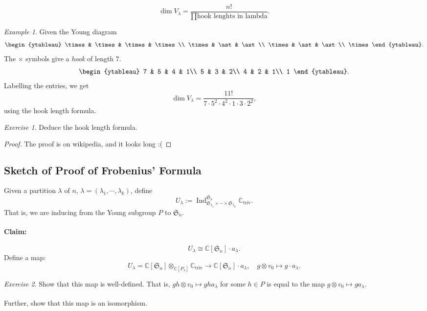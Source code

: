 \documentclass[a4paper]{report}
\theoremstyle{definition}
\theoremstyle{remark}
\theoremstyle{proposition}
\theoremstyle{conjecture}
\theoremstyle{lemma}
\theoremstyle{corollary}
\theoremstyle{exercise}
\newtheorem{exercise}{Exercise}
\theoremstyle{example}
\newtheorem{example}{Example}
\newcommand{\C}{\mathbb{C}}
\newcommand{\on}{\operatorname}
\begin{document}
\begin{theorem}
    $$\dim V_\lambda = \frac{n!}{\prod \text{hook lenghts in lambda}}.$$
\end{theorem}

\begin{example}
    Given the Young diagram
    $$\begin{ytableau}
        \times & \times & \times & \times\\
        \times & \ast & \ast\\
        \times & \ast & \ast\\
        \times
    \end{ytableau}.$$
    The $\times$ symbols give a \emph{hook} of length $7$. 
    $$\begin{ytableau}
        7 & 5 & 4 & 1\\
        5 & 3 & 2\\
        4 & 2 & 1\\
        1
    \end{ytableau}.$$
    Labelling the entries,
    we get 
    $$\dim V_\lambda = \frac{11!}{7\cdot 5^2 \cdot 4^2 \cdot 1 \cdot 3 \cdot 2^2},$$
    using the hook length formula.
\end{example}

\begin{exercise}
    Deduce the hook length formula.
\end{exercise}

\begin{proof}
    The proof is on wikipedia, and it looks long :(
\end{proof}

\subsection{Sketch of Proof of Frobenius' Formula}

Given a partition $\lambda$ of $n$, $\lambda = (\lambda_1,\cdots,\lambda_k)$,
define $$U_\lambda := \on{Ind}_{\mathfrak{S}_{\lambda_1}\times \cdots \times\mathfrak{S}_{\lambda_k}}^{\mathfrak{S}_n}\C_{\on{triv}}.$$
That is, we are inducing from the Young subgroup $P$ to $\mathfrak{S}_n$.
\paragraph{Claim:} $$U_\lambda \cong \C[\mathfrak{S}_n]\cdot a_\lambda.$$
Define a map:
$$U_\lambda = \C[\mathfrak{S}_n] \otimes_{\C[P_\lambda]} \C_{\on{triv}} \longrightarrow \C[\mathfrak{S}_n]\cdot a_\lambda,\quad g\otimes v_0 \longmapsto g\cdot a_\lambda.$$
\begin{exercise}
    Show that this map is well-defined. That is, $gh\otimes v_0 \mapsto gha_\lambda$ for some $h\in P$ is equal to the map 
    $g\otimes v_0 \mapsto ga_\lambda$.\\\\
    Further, show that this map is an isomorphism.
\end{exercise}
\end{document}
